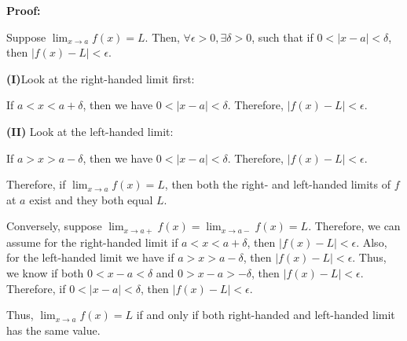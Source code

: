\documentclass[a4paper,12pt]{report}
\begin{document}
\noindent
\textbf{Proof: }

\noindent
Suppose $\displaystyle{\lim_{x\to a}}f(x)=L$. Then, $\forall \epsilon>0, \exists \delta>0$, such that if $0<|x-a|<\delta$, then $|f(x)-L|<\epsilon$. 

\noindent
\textbf{(I)}Look at the right-handed limit first: 

\noindent
If $a<x<a+\delta$, then we have $0<|x-a|<\delta$. Therefore, $|f(x)-L|<\epsilon$.

\noindent
\textbf{(II)} Look at the left-handed limit:

\noindent
If $a>x>a-\delta$, then we have $0<|x-a|<\delta$. Therefore, $|f(x)-L|<\epsilon$.

\noindent
Therefore, if $\displaystyle{\lim_{x\to a}}f(x)=L$, then both the 
right- and left-handed limits of $f$ at $a$ 
exist and they both equal $L$.

\noindent
Conversely, suppose $\displaystyle{\lim_{x\to a+}}f(x)=\displaystyle{\lim_{x\to a-}}f(x)=L$. Therefore, we can assume for the right-handed limit if $a<x<a+\delta$, then $|f(x)-L|<\epsilon$. Also, for the left-handed limit we have if $a>x>a-\delta$, then $|f(x)-L|<\epsilon$. Thus, we know if both $0<x-a<\delta$ and $0>x-a>-\delta$, then $|f(x)-L|<\epsilon$. Therefore, if $0<|x-a|<\delta$, then $|f(x)-L|<\epsilon$. 

\noindent
Thus, $\displaystyle{\lim_{x\to a}}f(x)=L$ if and only if both right-handed and left-handed limit has the same value.
\end{document}
